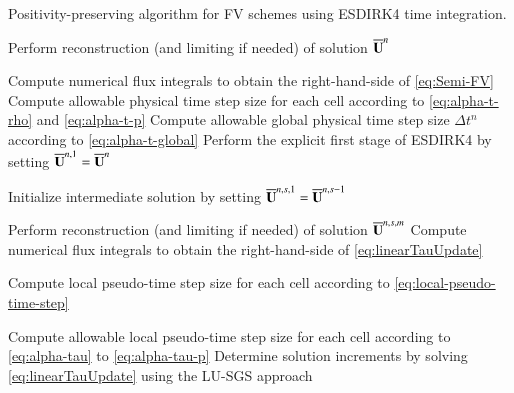  \begin{algorithm}[htbp!]
        \renewcommand{\baselinestretch}{1.3}\selectfont
 	\caption{Positivity-preserving algorithm for FV schemes using ESDIRK4 time integration.}  
 	\label{alg:pp-algorithm}
 	\begin{algorithmic}[1] 
        
        \State Perform reconstruction (and limiting if needed) of solution $\overline{\mathbf{U}}^{n}$ %
                
        \State Compute numerical flux integrals to obtain the right-hand-side of \eqref{eq:Semi-FV} %
        \State Compute allowable physical time step size for each cell according to \eqref{eq:alpha-t-rho} and \eqref{eq:alpha-t-p}
        \State Compute allowable global physical time step size $\Delta t^n$ according to \eqref{eq:alpha-t-global}
        \State Perform the explicit first stage of ESDIRK4 by setting $\overline{\mathbf{U}}^{n,1} =\overline{\mathbf{U}}^{n}$ %

        \State Initialize intermediate solution by setting $\overline{\mathbf{U}}^{n,s,1}=\overline{\mathbf{U}}^{n,s-1}$ 
        

        \State Perform reconstruction (and limiting if needed) of solution $\overline{\mathbf{U}}^{n,s,m}$ %
        \State Compute numerical flux integrals to obtain the right-hand-side of \eqref{eq:linearTauUpdate} %
        
        \State Compute local pseudo-time step size for each cell according to \eqref{eq:local-pseudo-time-step}

        \State Compute allowable local pseudo-time step size for each cell according to \eqref{eq:alpha-tau} to \eqref{eq:alpha-tau-p}
        \State Determine solution increments by solving \eqref{eq:linearTauUpdate} using the LU-SGS approach  %


\end{algorithmic}
\end{algorithm}
